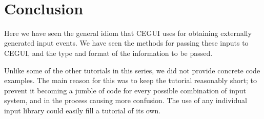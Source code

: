 ~\newline
 \hypertarget{input_tutorial_input_tutorial_conclusion}{}\section{Conclusion}\label{input_tutorial_input_tutorial_conclusion}
Here we have seen the general idiom that C\+E\+G\+UI uses for obtaining externally generated input events. We have seen the methods for passing these inputs to C\+E\+G\+UI, and the type and format of the information to be passed.

Unlike some of the other tutorials in this series, we did not provide concrete code examples. The main reason for this was to keep the tutorial reasonably short; to prevent it becoming a jumble of code for every possible combination of input system, and in the process causing more confusion. The use of any individual input library could easily fill a tutorial of it\textquotesingle{}s own. 